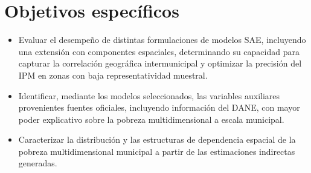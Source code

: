 \section{Objetivos específicos}

\begin{itemize}

    \item Evaluar el desempeño de distintas formulaciones de modelos SAE, incluyendo una extensión con componentes espaciales, determinando su capacidad para capturar la correlación geográfica intermunicipal y optimizar la precisión del IPM en zonas con baja representatividad muestral.
    
    \item Identificar, mediante los modelos seleccionados, las variables auxiliares provenientes fuentes oficiales, incluyendo información del DANE, con mayor poder explicativo sobre la pobreza multidimensional a escala municipal.
    
    \item Caracterizar la distribución y las estructuras de dependencia espacial de la pobreza multidimensional municipal a partir de las estimaciones indirectas generadas.
    
\end{itemize}


